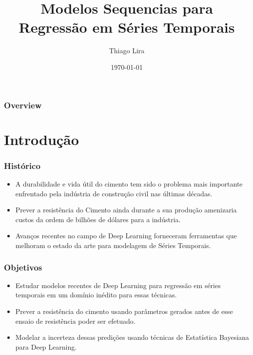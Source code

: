 \documentclass{beamer}
\title{Modelos Sequencias para Regressão em Séries Temporais} %
\author{Thiago Lira} %
\institute[IME-USP] %
{
Instituto de Matemática e Estatística - USP \\ %
\medskip
\textit{thlira@ime.usp.br} %
}
\date{\today} %
\begin{document}
\begin{frame}
\titlepage %
\end{frame}

\begin{frame}
\frametitle{Overview} %
\tableofcontents %
\end{frame}


\section{Introdução}


\begin{frame}
\frametitle{Histórico}

\begin{itemize}
\item A durabilidade e vida útil do cimento tem sido o problema mais importante enfrentado
pela indústria de construção civil nas últimas décadas.
\item Prever a resistência do Cimento ainda durante a sua produção amenizaria
  custos da ordem de bilhões de dólares para a indústria.
\item Avanços recentes no campo de Deep Learning forneceram ferramentas que
  melhoram o estado da arte para modelagem de Séries Temporais.
\end{itemize}

\end{frame}


\begin{frame}
\frametitle{Objetivos}

\begin{itemize}
\item Estudar modelos recentes de Deep Learning para regressão em séries
  temporais em um domínio inédito para essas técnicas. 
\item Prever a resistência do cimento usando parâmetros gerados antes de esse
  ensaio de resistência poder ser efetuado.
  \item Modelar a incerteza dessas predições usando técnicas de Estatística
    Bayesiana para Deep Learning.
\end{itemize}

\end{frame}
\end{document}
